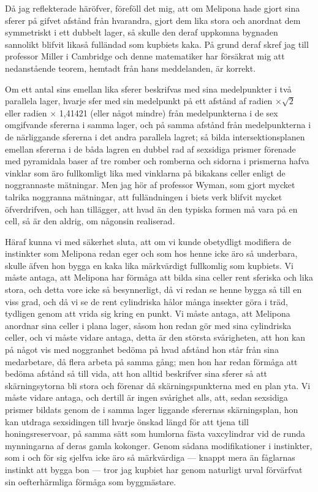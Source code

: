 Då jag reflekterade häröfver, föreföll det mig, att om Melipona hade gjort sina sferer på gifvet afstånd från hvarandra, gjort dem lika stora och anordnat dem symmetriskt i ett dubbelt lager, så skulle den deraf uppkomna bygnaden sannolikt blifvit likaså fulländad som kupbiets kaka. På grund deraf skref jag till professor Miller i Cambridge och denne matematiker har försäkrat mig att nedanstående teorem, hemtadt från hans meddelanden, är korrekt.

Om ett antal sins emellan lika sferer beskrifvas med sina medelpunkter i två parallela lager, hvarje sfer med sin medelpunkt på ett afstånd af radien $\times \sqrt{2}$ eller radien $\times$ 1,41421 (eller något mindre) från medelpunkterna i de sex omgifvande sfererna i samma lager, och på samma afstånd från medelpunkterna i de närliggande sfererna i det andra parallela lagret; så bilda intersektionsplanen emellan sfererna i de båda lagren en dubbel rad af sexsidiga prismer förenade med pyramidala baser af tre romber och romberna och sidorna i prismerna hafva vinklar som äro fullkomligt lika med vinklarna på bikakans celler enligt de noggrannaste mätningar. Men jag hör af professor Wyman, som gjort mycket talrika noggranna mätningar, att fulländningen i biets verk blifvit mycket öfverdrifven, och han tillägger, att hvad än den typiska formen må vara på en cell, så är den aldrig, om någonsin realiserad.

Häraf kunna vi med säkerhet sluta, att om vi kunde obetydligt modifiera de instinkter som Melipona redan eger och som hos henne icke äro så underbara, skulle äfven hon bygga en kaka lika märkvärdigt fullkomlig som kupbiets. Vi måste antaga, att Melipona har förmåga att bilda sina celler rent sferiska och lika stora, och detta vore icke så besynnerligt, då vi redan se henne bygga så till en viss grad, och då vi se de rent cylindriska hålor många insekter göra i träd, tydligen genom att vrida sig kring en punkt. Vi måste antaga, att Melipona anordnar sina celler i plana lager, såsom hon redan gör med sina cylindriska celler, och vi måste vidare antaga, detta är den största svårigheten, att hon kan på något vis med noggranhet bedöma på hvad afstånd hon står från sina medarbetare, då flera arbeta på samma gång; men hon har redan förmåga att bedöma afstånd så till vida, att hon alltid beskrifver sina sferer så att skärningsytorna bli stora och förenar då skärningspunkterna med en plan yta. Vi måste vidare antaga, och dertill är ingen svårighet alls, att, sedan sexsidiga prismer bildats genom de i samma lager liggande sferernas skärningsplan, hon kan utdraga sexsidingen till hvarje önskad längd för att tjena till honingsreservoar, på samma sätt som humlorna fästa vaxcylindrar vid de runda mynningarna af deras gamla kokonger. Genom sådana modifikationer i instinkter, som i och för sig sjelfva icke äro så märkvärdiga — knappt mera än fåglarnas instinkt att bygga bon — tror jag kupbiet har genom naturligt urval förvärfvat sin oefterhärmliga förmåga som byggmästare.

